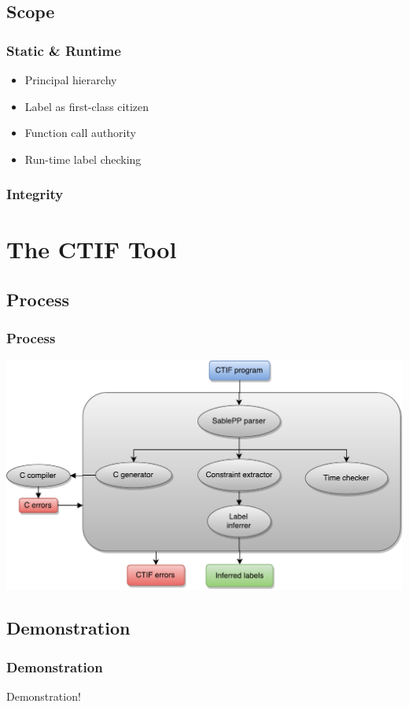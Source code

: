 \documentclass[10pt]{beamer}
\begin{document}
\subsection{Scope}
\begin{frame}
  \frametitle{Static \& Runtime}

  \begin{itemize}
    \item Principal hierarchy
    \item Label as first-class citizen
    \item Function call authority
    \item Run-time label checking
  \end{itemize}
\end{frame}

\begin{frame}
  \frametitle{Integrity}

\end{frame}

\section{The CTIF Tool}

\subsection{Process}
\begin{frame}
  \frametitle{Process}
  \includegraphics[width=\textwidth]{figures/thetool.pdf}
\end{frame}

\subsection{Demonstration}
\begin{frame}
  \frametitle{Demonstration}
  Demonstration!
\end{frame}
\end{document}
